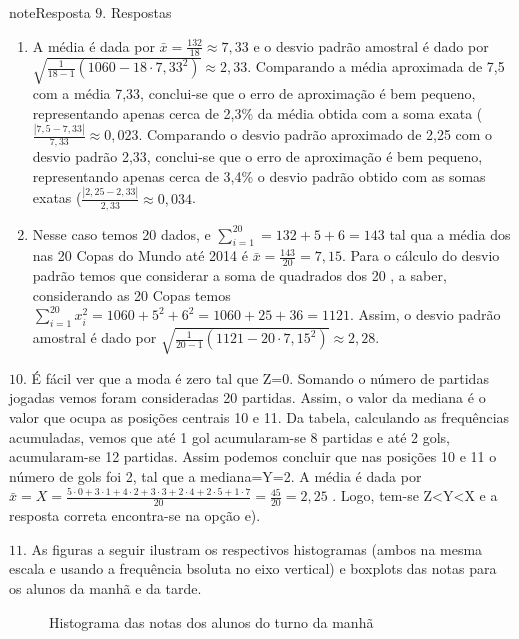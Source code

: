 \begin{sphinxadmonition}{note}{Resposta}
\(9.\) Respostas
\begin{enumerate}
\item {} 
A média é dada por \(\bar{x}=\frac{132}{18}\approx 7,33\) e o desvio padrão amostral é dado por \(\sqrt{\frac{1}{18-1}\left (1060-18\cdot 7,33^2\right )}\approx 2,33\). Comparando a média aproximada de 7,5 com a média 7,33, conclui-se que o erro de aproximação é bem pequeno, representando apenas cerca de 2,3\% da média obtida com a soma exata (\(\frac{|7,5-7,33|}{7,33}\approx 0,023\). Comparando o desvio padrão aproximado de 2,25 com o desvio padrão 2,33, conclui-se que o erro de aproximação é bem pequeno, representando apenas cerca de 3,4\% o desvio padrão obtido com as somas exatas (\(\frac{|2,25-2,33|}{2,33}\approx 0,034\).

\item {} 
Nesse caso temos 20 dados, e \(\displaystyle{\sum^{20}_{i=1}}=132+5+6=143\) tal qua a média dos  nas 20 Copas do Mundo até 2014 é \(\bar{x}=\frac{143}{20}=7,15\). Para o cálculo do desvio padrão temos que considerar a soma de quadrados dos 20 , a saber, considerando as 20 Copas temos \(\displaystyle{\sum^{20}_{i=1}}x^2_i=1060+5^2+6^2=1060+25+36=1121\). Assim, o desvio padrão amostral é dado por \(\sqrt{\frac{1}{20-1}\left (1121-20\cdot 7,15^2\right )}\approx 2,28\).

\end{enumerate}

\(10.\) É fácil ver que a moda é zero tal que Z=0. Somando o número de partidas jogadas vemos foram consideradas 20 partidas. Assim, o valor da mediana é o valor que ocupa as posições centrais 10 e 11. Da tabela, calculando as frequências acumuladas, vemos que até 1 gol acumularam-se 8 partidas e até 2 gols, acumularam-se 12 partidas. Assim podemos concluir que nas posições 10 e 11 o número de gols foi 2, tal que a mediana=Y=2. A média é dada por \(\bar{x}=X=\frac{5\cdot 0+3\cdot 1 +4\cdot 2+3\cdot 3+2\cdot 4+2\cdot 5+1\cdot 7}{20}=\frac{45}{20}=2,25\) . Logo, tem-se Z\textless{}Y\textless{}X e a resposta correta encontra-se na opção e).

\(11.\) As figuras a seguir ilustram os respectivos histogramas (ambos na mesma escala e usando a frequência bsoluta no eixo vertical) e boxplots das notas para os alunos da manhã e da tarde.

\begin{figure}[H]
\centering
\capstart

\noindent{}
\caption{Histograma das notas dos alunos do turno da manhã}\label{\detokenize{PE104-E:fig-coloque-aqui-o-nome}}\label{\detokenize{PE104-E:id12}}\end{figure}


\end{sphinxadmonition}
